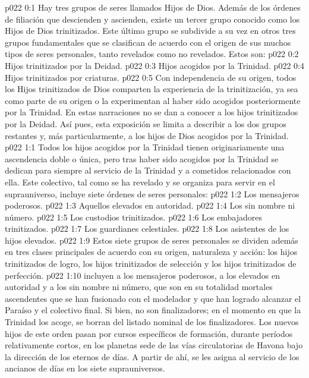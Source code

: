 \author{Mensajero poderoso}
\vs p022 0:1 Hay tres grupos de seres llamados Hijos de Dios. Además de los órdenes de filiación que descienden y ascienden, existe un tercer grupo conocido como los Hijos de Dios trinitizados. Este último grupo se subdivide a su vez en otros tres grupos fundamentales que se clasifican de acuerdo con el origen de sus muchos tipos de seres personales, tanto revelados como no revelados. Estos son:
\vs p022 0:2 Hijos trinitizados por la Deidad.
\vs p022 0:3 Hijos acogidos por la Trinidad.
\vs p022 0:4 Hijos trinitizados por criaturas.
\vs p022 0:5 Con independencia de su origen, todos los Hijos trinitizados de Dios comparten la experiencia de la trinitización, ya sea como parte de su origen o la experimentan al haber sido acogidos posteriormente por la Trinidad. En estas narraciones no se dan a conocer a los hijos trinitizados por la Deidad. Así pues, esta exposición se limita a describir a los dos grupos restantes y, más particularmente, a los hijos de Dios acogidos por la Trinidad.
\vs p022 1:1 Todos los hijos acogidos por la Trinidad tienen originariamente una ascendencia doble o única, pero tras haber sido acogidos por la Trinidad se dedican para siempre al servicio de la Trinidad y a cometidos relacionados con ella. Este colectivo, tal como se ha revelado y se organiza para servir en el suprauniverso, incluye siete órdenes de seres personales:
\vs p022 1:2 Los mensajeros poderosos.
\vs p022 1:3 Aquellos elevados en autoridad.
\vs p022 1:4 Los sin nombre ni número.
\vs p022 1:5 Los custodios trinitizados.
\vs p022 1:6 Los embajadores trinitizados.
\vs p022 1:7 Los guardianes celestiales.
\vs p022 1:8 Los asistentes de los hijos elevados.
\vs p022 1:9 \pc Estos siete grupos de seres personales se dividen además en tres clases principales de acuerdo con su origen, naturaleza y acción: los hijos trinitizados de logro, los hijos trinitizados de selección y los hijos trinitizados de perfección.
\vs p022 1:10 \pc {} incluyen a los mensajeros poderosos, a los elevados en autoridad y a los sin nombre ni número, que son en su totalidad mortales ascendentes que se han fusionado con el modelador y que han logrado alcanzar el Paraíso y el colectivo final. Si bien, no son finalizadores; en el momento en que la Trinidad los acoge, se borran del listado nominal de los finalizadores. Los nuevos hijos de este orden pasan por cursos específicos de formación, durante períodos relativamente cortos, en los planetas sede de las vías circulatorias de Havona bajo la dirección de los eternos de días. A partir de ahí, se les asigna al servicio de los ancianos de días en los siete suprauniversos.
